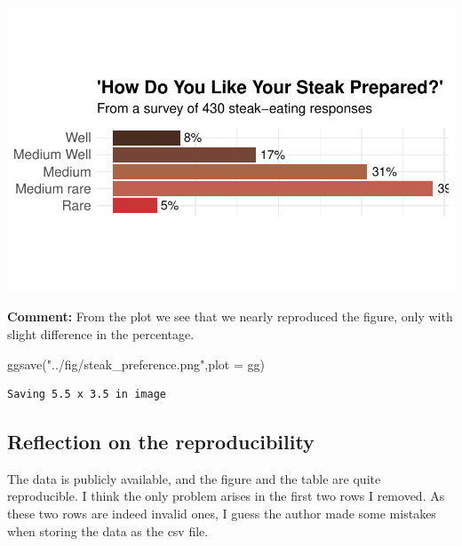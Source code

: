 \documentclass[
  letterpaper,
  DIV=11,
  numbers=noendperiod]{scrartcl}
\newenvironment{Shaded}{\begin{snugshade}}{\end{snugshade}}
\newcommand{\AttributeTok}[1]{\textcolor[rgb]{0.40,0.45,0.13}{#1}}
\newcommand{\FunctionTok}[1]{\textcolor[rgb]{0.28,0.35,0.67}{#1}}
\newcommand{\NormalTok}[1]{\textcolor[rgb]{0.00,0.23,0.31}{#1}}
\newcommand{\StringTok}[1]{\textcolor[rgb]{0.13,0.47,0.30}{#1}}
\begin{document}
\includegraphics{steak_analysis_files/figure-pdf/unnamed-chunk-7-1.pdf}

\textbf{Comment:} From the plot we see that we nearly reproduced the
figure, only with slight difference in the percentage.

\begin{Shaded}
\begin{Highlighting}[]
\FunctionTok{ggsave}\NormalTok{(}\StringTok{"../fig/steak\_preference.png"}\NormalTok{,}\AttributeTok{plot =}\NormalTok{ gg)}
\end{Highlighting}
\end{Shaded}

\begin{verbatim}
Saving 5.5 x 3.5 in image
\end{verbatim}

\subsection{Reflection on the
reproducibility}\label{reflection-on-the-reproducibility}

The data is publicly available, and the figure and the table are quite
reproducible. I think the only problem arises in the first two rows I
removed. As these two rows are indeed invalid ones, I guess the author
made some mistakes when storing the data as the csv file.
\end{document}
